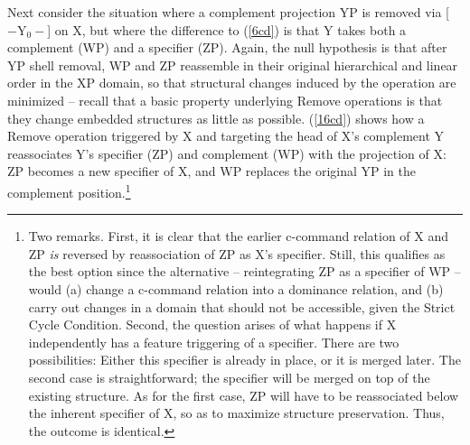\documentclass[output=paper]{langsci/langscibook}
\begin{document}
\noindent Next consider the situation where a complement projection YP is
removed via [$-\text{Y}_0-$] on X, but where the difference to (\ref{6cd}) is
that Y takes both a complement (WP) and a specifier (ZP).  Again, the null
hypothesis is that after YP shell removal,  WP and ZP reassemble in their
original hierarchical and linear order in the XP domain, so that structural
changes induced by the operation are minimized -- recall that a basic property
underlying Remove operations is that they change embedded structures as little
as possible. (\ref{16cd}) shows how a Remove operation triggered by X and
targeting the head of X's complement Y reassociates Y's specifier (ZP) and
complement (WP) with the projection of X: ZP becomes a new specifier of X, and
WP replaces the original YP in the complement
position.\footnote{\label{spr7s}Two remarks.  First, it is clear that the
    earlier c-command relation of X and ZP {\it is} reversed by reassociation
    of ZP as X's specifier. Still, this qualifies as the best option since the
    alternative -- reintegrating ZP as a specifier of WP -- would (a) change a
    c-command relation into a dominance relation, and (b) carry out changes in
    a domain that should not be accessible, given the Strict Cycle Condition.
    Second, the question arises of what happens if X independently has a
    feature triggering  of a specifier. There are two possibilities:
    Either this specifier is already in place, or it is merged later. The
    second case is straightforward; the specifier will be merged on top of the
    existing structure. As for the first case, ZP will have to be
    reassociated below the inherent specifier of X, so as to maximize structure
preservation. Thus, the outcome is identical.}
\end{document}
